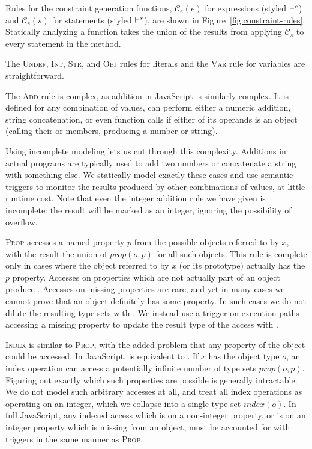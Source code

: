 Rules for the constraint generation functions, $\mathcal{C}_e(e)$ for
expressions (styled $\vdash^e$) and $\mathcal{C}_s(s)$ for statements (styled $\vdash^s$),
are shown in
Figure~\ref{fig:constraint-rules}. Statically analyzing a function takes
the union of the results from applying $\mathcal{C}_s$ to every
statement in the method.

The \textsc{Undef}, \textsc{Int}, \textsc{Str}, and \textsc{Obj}
rules for literals and the \textsc{Var} rule for variables are
straightforward.

The \textsc{Add} rule is complex, as addition in JavaScript is similarly complex. It is
defined for any combination of values, can perform either a numeric addition,
string concatenation, or even function calls if either of its operands is an
object (calling their  or  members, producing a
number or string).

Using incomplete modeling lets us cut through this complexity.
Additions in actual programs are typically used to add two numbers
or concatenate a string with something else.
We statically model exactly these cases
and use semantic triggers to monitor the results produced by other
combinations of values, at little runtime cost.
Note that even the integer addition rule we have given is incomplete: the
result will be marked as an integer, ignoring the possibility of
overflow.

\textsc{Prop} accesses a named property $p$ from the possible objects referred
to by $x$, with the result the union of $\mathit{prop}(o,p)$ for all such
objects.  This rule is complete only in cases where the object referred to by
$x$ (or its prototype) actually has the $p$ property. Accesses on properties
which are not actually part of an object produce .
Accesses on missing properties are rare,
and yet in many cases we cannot prove that an object
definitely has some property. In such cases we do not dilute the
resulting type sets with . We instead use a trigger
on execution paths accessing a missing property to update the result type
of the access with .

\textsc{Index} is similar to \textsc{Prop}, with the added problem that any
property of the object could be accessed.  In JavaScript,  is
equivalent to . If $x$ has the object type $o$, an index operation
can access a potentially infinite number of type sets $\mathit{prop}(o,p)$.
Figuring out exactly which such properties are possible is generally
intractable. We do not model such arbitrary accesses at all, and treat
all index operations as operating on an integer,
 which we collapse into a single type set
$\mathit{index}(o)$.  In full JavaScript, any indexed access which is on a
non-integer property, or is on an integer property which is missing from an
object, must be accounted for with triggers in the same manner as
\textsc{Prop}.

